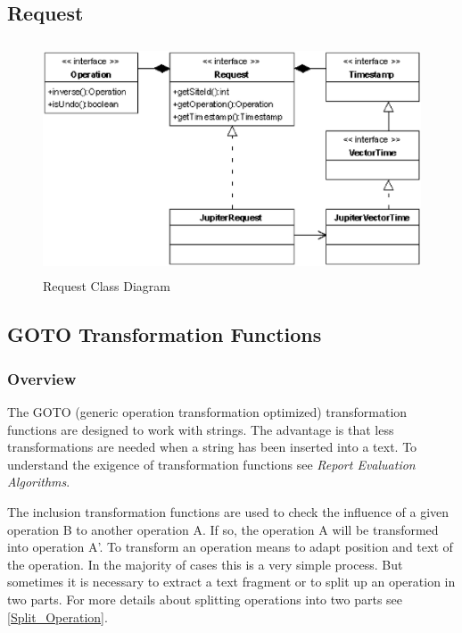 \newpage
\subsection{Request}
\begin{figure}[H]
\centering
\includegraphics[height=6.87cm,width=12.09cm]{../../images/algo-impl/request_classdiagram.eps}
\caption{Request Class Diagram}
\label{Request Class Diagram}
\end{figure}


\newpage
\subsection{GOTO Transformation Functions}

\subsubsection{Overview}
The GOTO (generic operation transformation optimized) transformation functions are designed to work with strings. The advantage is that less transformations are needed when a string has been inserted into a text. To understand the exigence of transformation functions see \emph{Report Evaluation Algorithms}.

The inclusion transformation functions are used to check the influence of a given operation B to another operation A. If so, the operation A will be transformed into operation A'. To transform an operation means to adapt position and text of the operation. In the majority of cases this is a very simple process. But sometimes it is necessary to extract a text fragment or to split up an operation in two parts. For more details about splitting operations into two parts see \ref{Split_Operation}.

